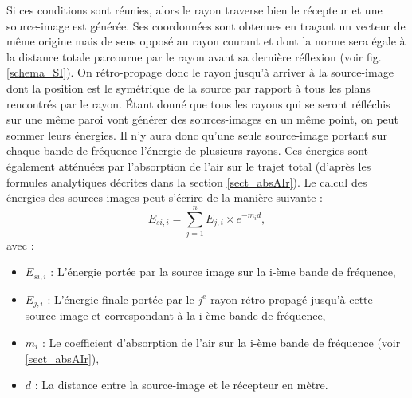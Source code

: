 %
Si ces conditions sont réunies, alors le rayon traverse bien le récepteur et une source-image est générée. Ses coordonnées sont obtenues en traçant un vecteur de même origine mais de sens opposé au rayon courant et dont la norme sera égale à la distance totale parcourue par le rayon avant sa dernière réflexion (voir fig. \ref{schema_SI}). On rétro-propage donc le rayon jusqu'à arriver à la source-image dont la position est le symétrique de la source par rapport à tous les plans rencontrés par le rayon. Étant donné que tous les rayons qui se seront réfléchis sur une même paroi vont générer des sources-images en un même point, on peut sommer leurs énergies. Il n'y aura donc qu'une seule source-image portant sur chaque bande de fréquence l'énergie de plusieurs rayons. Ces énergies sont également atténuées par l'absorption de l'air sur le trajet total (d'après les formules analytiques décrites dans la section \ref{sect_absAIr}). Le calcul des énergies des sources-images peut s'écrire de la manière suivante :
%
\begin{equation}
E_{si, i} = \sum_{j=1}^n E_{j, i} \times e^{-m_id},
\end{equation}
avec : 
\begin{itemize}
\item $E_{si, i}$ : L'énergie portée par la source image sur la i-ème bande de fréquence,
\item $E_{j, i}$ : L'énergie finale portée par le $j^e$ rayon rétro-propagé jusqu'à cette source-image et correspondant à la i-ème bande de fréquence,
\item $m_i$ : Le coefficient d'absorption de l'air sur la i-ème bande de fréquence (voir \ref{sect_absAIr}),
\item $d$ : La distance entre la source-image et le récepteur en mètre.
\end{itemize}

